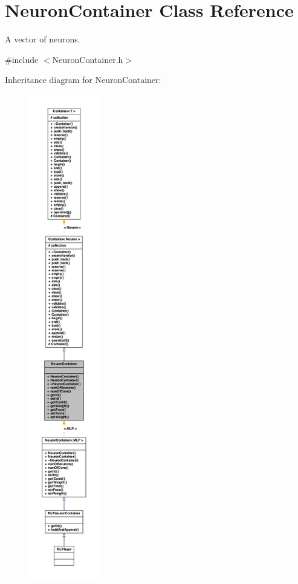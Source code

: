 \hypertarget{class_neuron_container}{
\section{NeuronContainer Class Reference}
\label{class_neuron_container}
}


A vector of neurons.  




{\ttfamily \#include $<$NeuronContainer.h$>$}



Inheritance diagram for NeuronContainer:\nopagebreak
\begin{figure}[H]
\begin{center}
\leavevmode
\includegraphics[height=600pt]{class_neuron_container__inherit__graph}
\end{center}
\end{figure}



